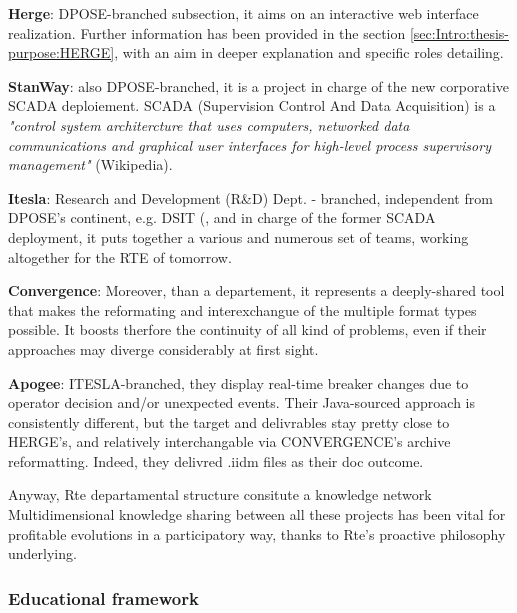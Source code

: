 \begin{description}

	\item\textbf{Herge}: DPOSE-branched subsection, it aims on an interactive web interface realization. Further information has been provided in the section \ref{sec:Intro:thesis-purpose:HERGE}, with an aim in deeper  explanation and specific roles detailing.

	\item\textbf{StanWay}: also DPOSE-branched, it is a project in charge of the new corporative SCADA deploiement. SCADA (Supervision Control And Data Acquisition) is a \textit{"control system architercture that uses computers, networked data communications and graphical user interfaces for high-level process supervisory management"} (Wikipedia).
	
	\item\textbf{Itesla}:  Research and Development (R\&D) Dept. - branched, independent from DPOSE's continent, e.g. DSIT (, and in charge of the former SCADA deployment, it puts together a various and numerous set of teams, working altogether for the RTE of tomorrow.
	
	\item\textbf{Convergence}: Moreover, than a departement, it represents a deeply-shared tool that makes the reformating and interexchangue of the multiple format types possible. It boosts therfore the continuity of all kind of problems, even if their approaches may diverge considerably at first sight. 
	
	\item\textbf{Apogee}: ITESLA-branched, they display real-time breaker changes due to operator decision and/or unexpected events. Their Java-sourced approach is consistently different, but the target and delivrables stay pretty close to HERGE's, and relatively interchangable via CONVERGENCE's archive reformatting. Indeed, they delivred .iidm files as their doc outcome.
	
\end{description}

Anyway, Rte departamental structure consitute a knowledge network  Multidimensional knowledge sharing between all these projects has been vital for profitable evolutions in a participatory way, thanks to Rte's proactive philosophy underlying.

\subsubsection{Educational framework}
\label{subsubsec:Intro:Thesis-purpose:Framework:Educational-framework}

